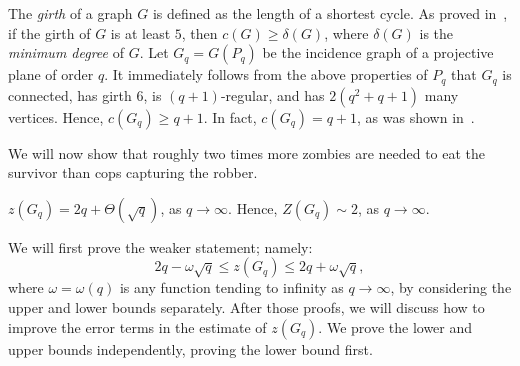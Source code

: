 \documentclass[12pt]{amsart}
\begin{document}
\bigskip

The \emph{girth} of a graph $G$ is defined as the length of a shortest cycle. As proved in~\cite{af}, if the girth of $G$ is at least $5$, then $c(G) \ge \delta(G)$, where $\delta(G)$ is the
\emph{minimum degree} of $G$. Let $G_q =G(P_q)$ be the incidence graph of a projective plane of order $q$. It immediately follows from the above properties of $P_q$ that $G_q$ is connected, has girth $6$, is $(q+1)$-regular, and has $2(q^2 + q + 1)$ many vertices. Hence, $c(G_q) \ge q+1$. In fact, $c(G_q)=q+1$, as was shown in~\cite{p}.

\medskip

We will now show that roughly two times more zombies are needed to eat the survivor than cops capturing the robber.

\begin{theorem}\label{proj}
$z(G_q) = 2q + \Theta(\sqrt{q})$, as $q \to \infty$. Hence, $Z(G_{q}) \sim 2$, as $q \to \infty$.
\end{theorem}

\noindent
We will first prove the weaker statement; namely:
$$
2q - \omega \sqrt{q} \le z(G_q) \le 2q + \omega \sqrt{q},
$$
where $\omega = \omega(q)$ is any function tending to infinity as $q\to \infty$,
by considering the upper and lower bounds separately.
After those proofs, we will discuss how to improve the error terms in the estimate of $z(G_q)$. We prove the lower and upper bounds independently, proving the lower bound first.
\end{document}

